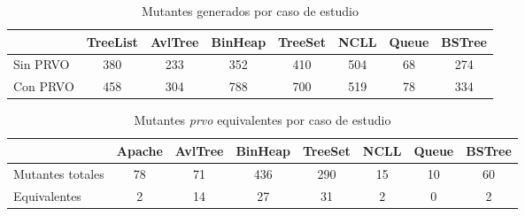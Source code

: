 \begin{table}[]
	\centering
	\small
	\begin{tabular}{l|ccccccc|}
		\cline{2-8}
		& \multicolumn{1}{l}{TreeList} & \multicolumn{1}{l}{AvlTree} & \multicolumn{1}{l}{BinHeap} & \multicolumn{1}{l}{TreeSet} & \multicolumn{1}{l}{NCLL} & \multicolumn{1}{l}{Queue} & \multicolumn{1}{l|}{BSTree} \\ \hline
		\multicolumn{1}{|l|}{Sin PRVO} & 380 & 233 & 352 & 410 & 504 & 68 & 274\\ \cline{1-1}
		\multicolumn{1}{|l|}{Con PRVO} & 458 & 304 & 788 & 700 & 519 & 78 & 334\\ \hline
	\end{tabular}
	\caption{Mutantes generados por caso de estudio}
	\label{tables.results.mutants}
\end{table}

\begin{table}[]
	\centering
	\small
	\def\arraystretch{0.95}
	\setlength\tabcolsep{0.5mm}
	\begin{tabular}{l|ccccccc|}
		\cline{2-8}
		& \multicolumn{1}{l}{Apache} & \multicolumn{1}{l}{AvlTree} & \multicolumn{1}{l}{BinHeap} & \multicolumn{1}{l}{TreeSet} & \multicolumn{1}{l}{NCLL} & \multicolumn{1}{l}{Queue} & \multicolumn{1}{l|}{BSTree}\\ \hline
		\multicolumn{1}{|l|}{Mutantes totales} & 78 & 71 & 436 & 290 & 15 & 10 & 60\\ \cline{1-1}
		\multicolumn{1}{|l|}{Equivalentes} & 2 & 14 & 27 & 31 & 2 & 0 & 2\\ \hline
	\end{tabular}
	\caption{Mutantes \emph{prvo} equivalentes por caso de estudio}
	\label{tables.results.equivalents}
\end{table}

